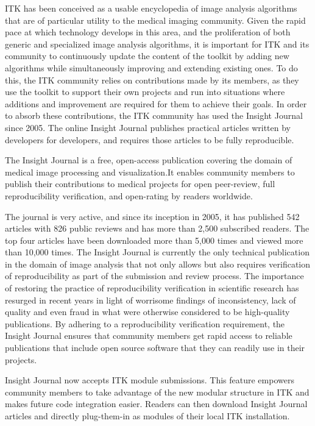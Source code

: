 \documentclass{frontiersENG} %
\begin{document}
ITK has been conceived as a usable encyclopedia of image analysis algorithms
that are of particular utility to the medical imaging community. Given the
rapid pace at which technology develops in this area, and the proliferation of
both generic and specialized image analysis algorithms, it is important for ITK
and its community to continuously update the content of the toolkit by adding
new algorithms while simultaneously improving and extending existing ones. To
do this, the ITK community relies on contributions made by its members, as they
use the toolkit to support their own projects and run into situations where
additions and improvement are required for them to achieve their goals. In
order to absorb these contributions, the ITK community has used the Insight
Journal \cite{InsightJournal} since 2005. The online Insight Journal
publishes practical articles written by developers for developers, and requires
those articles to be fully reproducible.

The Insight Journal is a free, open-access publication covering the domain of
medical image processing and visualization.It enables community members to
publish their contributions to medical projects for open peer-review, full
reproducibility verification, and open-rating by readers worldwide.

The journal is very active, and since its inception in 2005, it has published
542 articles with 826 public reviews and has more than 2,500 subscribed
readers. The top four articles have been downloaded more than 5,000 times and
viewed more than 10,000 times. The Insight Journal is currently the only
technical publication in the domain of image analysis that not only allows but
also requires verification of reproducibility as part of the submission and
review process. The importance of restoring the practice of reproducibility
verification in scientific research has resurged in recent years in light of
worrisome findings of inconsistency, lack of quality and even fraud in what
were otherwise considered to be high-quality publications. By adhering to a
reproducibility verification requirement, the Insight Journal ensures that
community members get rapid access to reliable publications that include open
source software that they can readily use in their projects.

Insight Journal now accepts ITK module submissions. This feature empowers
community members to take advantage of the new modular structure in ITK and
makes future code integration easier. Readers can then download Insight Journal
articles and directly plug-them-in as modules of their local ITK installation.
\end{document}

